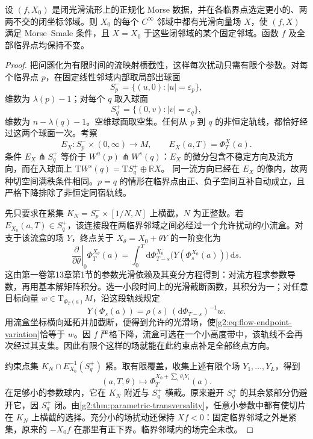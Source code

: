 \begin{theorem}\label{g2:thm:morse-smale-existence}
	设 \((f,X_0)\) 是闭光滑流形上的正规化 Morse 数据，并在各临界点选定更小的、两两不交的闭坐标邻域。则 \(X_0\) 的每个 \(C^\infty\) 邻域中都有光滑向量场 \(X\)，使 \((f,X)\) 满足 Morse--Smale 条件，且 \(X=X_0\) 于这些闭邻域的某个固定邻域。函数 \(f\) 及全部临界点均保持不变。
\end{theorem}
\begin{proof}
	把问题化为有限时间的流映射横截性，这样每次扰动只需有限个参数。对每个临界点 \(p\)，在固定线性邻域内部取局部出球面
	\[
		S_p^-=\{(u,0):|u|=\varepsilon_p\},
	\]
	维数为 \(\lambda(p)-1\)；对每个 \(q\) 取入球面
	\[
		S_q^+=\{(0,v):|v|=\varepsilon_q\},
	\]
	维数为 \(n-\lambda(q)-1\)。空维球面取空集。任何从 \(p\) 到 \(q\) 的非恒定轨线，都恰好经过这两个球面一次。考察
	\[
		E_X:S_p^-\times(0,\infty)\longrightarrow M,\qquad
		E_X(a,T)=\Phi_T^X(a).
	\]
	条件 \(E_X\pitchfork S_q^+\) 等价于 \(W^u(p)\pitchfork W^s(q)\)：\(E_X\) 的微分包含不稳定方向及流方向，而在入球面上
	\(\mathrm T W^s(q)=\mathrm T S_q^+\oplus\mathbb RX\)。
	同一流方向已经在 \(E_X\) 的像内，故两种切空间满秩条件相同。\(p=q\) 的情形在临界点由正、负子空间互补自动成立，且严格下降排除了非恒定同宿轨线。

	先只要求在紧集 \(K_N=S_p^-\times[1/N,N]\) 上横截，\(N\) 为正整数。若 \(E_{X_0}(a,T)\in S_q^+\)，该连接段在两临界邻域之间必经过一个允许扰动的小流盒。对支于该流盒的场 \(Y\)，终点关于 \(X_\theta=X_0+\theta Y\) 的一阶变化为
	\begin{equation}\label{g2:eq:flow-endpoint-variation}
		\left.\frac{\partial}{\partial\theta}\right|_0
		\Phi_T^{X_\theta}(a)
		=\int_0^T
		\mathrm d\Phi_{T-s}^{X_0}\bigl(Y(\Phi_s^{X_0}(a))\bigr)\,\mathrm ds.
	\end{equation}
	这由第一卷第13章第1节的参数光滑依赖及其变分方程得到：对流方程求参数导数，再用基本解矩阵积分。选一小段时间上的光滑截断函数，其积分为一；对任意目标向量 \(w\in\mathrm T_{\Phi_T(a)}M\)，沿这段轨线规定
	\[
		Y(\Phi_s(a))=\rho(s)\,
		(\mathrm d\Phi_{T-s})^{-1}w.
	\]
	用流盒坐标横向延拓并加截断，便得到允许的光滑场，使\eqref{g2:eq:flow-endpoint-variation}恰等于 \(w\)。因 \(f\) 严格下降，流盒可选在一个小高度带中，该轨线不会再次经过其支集。因此有限个这样的场就能在此约束点补足全部终点方向。

	约束点集 \(K_N\cap E_{X_0}^{-1}(S_q^+)\) 紧。取有限覆盖，收集上述有限个场 \(Y_1,\ldots,Y_L\)，得到
	\[
		(a,T,\theta)\longmapsto
		\Phi_T^{X_0+\sum_i\theta_iY_i}(a).
	\]
	在足够小的参数球内，它在 \(K_N\) 附近与 \(S_q^+\) 横截。原来避开 \(S_q^+\) 的其余紧部分仍避开它，因 \(S_q^+\) 闭。由\cref{g2:thm:parametric-transversality}，任意小参数中都有使切片在 \(K_N\) 上横截的选择。充分小的场扰动还保持 \(Xf<0\)：固定临界邻域之外是紧集，原来的 \(-X_0f\) 在那里有正下界。临界邻域内的场完全未改。


\end{proof}
